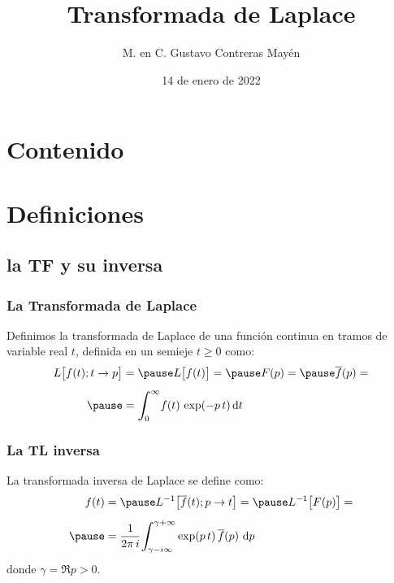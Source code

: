 \documentclass[12pt]{beamer}
\date{14 de enero de 2022}
\title{\large{Transformada de Laplace}}
\author{M. en C. Gustavo Contreras Mayén}
\begin{document}
\maketitle
\fontsize{14}{14}\selectfont
{}

\section*{Contenido}


\section{Definiciones}
\subsection{la TF y su inversa}

\begin{frame}
\frametitle{La Transformada de Laplace}
Definimos la transformada de Laplace de una función continua en tramos de variable real $t$, definida en un semieje $t \geq 0$ como:
\pause
\begin{eqnarray}
\begin{aligned}
L \big[f(t); t \to p\big] &= \pause L \big[f(t)\big] = \pause F(p) = \pause \overline{f}(p) = \\[0.5em] \pause
&= \scaleint{6ex}_{\bs 0}^{\infty} f(t) \, \exp(-p \, t) \dd{t}
\end{aligned}
\label{eq:ecuacion_03_03}
\end{eqnarray}
\end{frame}
\begin{frame}
\frametitle{La TL inversa}
La transformada inversa de Laplace se define como:
\pause
\begin{eqnarray}
\begin{aligned}
f(t) &= \pause L^{-1} \big[\overline{f}(t); p \to t\big] = \pause L^{-1} \big[F(p)\big] = \\[0.5em] \pause
&= \dfrac{1}{2 \pi \, i} \scaleint{6ex}_{\bs \gamma-i \infty}^{\gamma+\infty} \exp(p \, t) \, \overline{f} (p) \, \dd{p}
\end{aligned}
\label{eq:ecuacion_03_04}
\end{eqnarray}
donde $\gamma = \Re{p} > 0$.
\end{frame}
\end{document}
